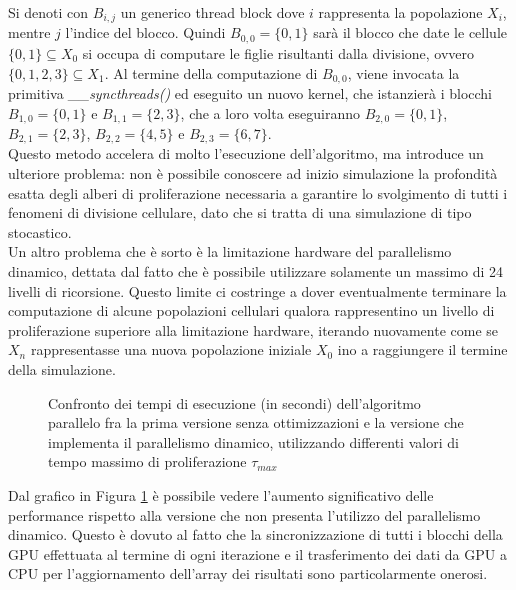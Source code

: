 Si denoti con $B_{i,j}$ un generico thread block dove
$i$ rappresenta la popolazione $X_{i}$, mentre $j$ l'indice del blocco.
Quindi $B_{0,0} = \{0, 1\}$ sarà il blocco che date le
cellule $\{0, 1\} \subseteq X_{0}$ si occupa di
computare le figlie risultanti dalla divisione, ovvero
$\{0, 1, 2, 3\} \subseteq X_{1}$.
Al termine della computazione di $B_{0,0}$, viene invocata la primitiva 
\textit{\_\_syncthreads()} ed eseguito un nuovo kernel, che istanzierà
i blocchi $B_{1,0} = \{0, 1\}$ e $B_{1,1} = \{2, 3\}$, che a loro volta
eseguiranno $B_{2,0} = \{0, 1\}$, $B_{2,1} = \{2, 3\}$,
$B_{2,2} = \{4, 5\}$ e $B_{2,3} = \{6, 7\}$.
\\
Questo metodo accelera di molto l'esecuzione dell'algoritmo, ma introduce un
ulteriore problema: non è possibile conoscere ad inizio simulazione la
profondità esatta degli alberi di proliferazione necessaria a garantire lo
svolgimento di tutti i fenomeni di divisione cellulare, dato che si tratta di
una simulazione di tipo stocastico.
\\
Un altro problema che è sorto è la limitazione hardware del parallelismo
dinamico, dettata dal fatto che è possibile utilizzare solamente un massimo
di 24 livelli di ricorsione. Questo limite ci costringe a dover
eventualmente terminare la computazione di alcune popolazioni cellulari qualora
rappresentino un livello di proliferazione superiore alla limitazione hardware,
iterando nuovamente come se $X_{n}$ rappresentasse una nuova
popolazione iniziale $X_{0}$ ino a raggiungere il termine della simulazione.

\begin{figure}[t]
    \centering
    \caption{Confronto dei tempi di esecuzione (in secondi) dell'algoritmo
    parallelo fra la prima versione senza ottimizzazioni e la versione
    che implementa il parallelismo dinamico, utilizzando differenti valori di
    tempo massimo di proliferazione $\tau_{max}$}
    \label{chart:original-dynamic}
\end{figure}
Dal grafico in Figura \ref{chart:original-dynamic} è possibile vedere
l'aumento significativo delle
performance rispetto alla versione che non presenta l'utilizzo del
parallelismo dinamico. Questo è dovuto al fatto che la
sincronizzazione di tutti i blocchi della GPU effettuata al termine di ogni
iterazione e il trasferimento
dei dati da GPU a CPU per l'aggiornamento dell'array dei risultati sono
particolarmente onerosi.

